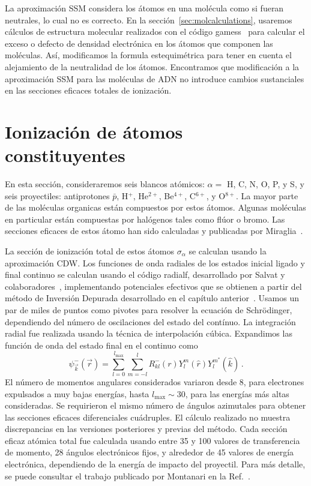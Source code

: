 La aproximación SSM considera los átomos en una molécula como si fueran
neutrales, lo cual no es correcto. En la sección~\ref{sec:molcalculations}, 
usaremos cálculos de estructura molecular realizados con el código
{\sc gamess}~\cite{gamess} para calcular el exceso o defecto de densidad 
electrónica en los átomos que componen las moléculas. Así, modificamos
la formula estequimétrica para tener en cuenta el alejamiento de la 
neutralidad de los átomos. Encontramos que modificación a la aproximación 
SSM para las moléculas de ADN no introduce cambios sustanciales en las 
secciones eficaces totales de ionización.

\section{Ionización de átomos constituyentes}
\label{sec:atoms}

En esta sección, consideraremos seis blancos atómicos: $\alpha=$ H, C, 
N, O, P, y S, y seis proyectiles: antiprotones $\bar{p}$, H$^{+}$, 
He$^{2+}$, Be$^{4+}$, C$^{6+}$, y O$^{8+}$. La mayor parte de las 
moléculas organicas están compuestos por estos átomos. Algunas moléculas
en particular están compuestas por halógenos tales como flúor o bromo.
Las secciones eficaces de estos átomo han sido calculadas y publicadas
por Miraglia~\cite{miraglia2008}.

La sección de ionización total de estos átomos $\sigma_{\alpha}$ se
calculan usando la aproximación CDW. Los funciones de onda radiales
de los estados inicial ligado y final continuo se calculan usando el
código {\sc radialf}, desarrollado por Salvat y 
colaboradores~\cite{salvat1995}, implementando potenciales efectivos que
se obtienen a partir del método de Inversión Depurada desarrollado en el
capítulo anterior~\cite{Mendez:16,Mendez:18}. Usamos un par de miles
de puntos como pivotes para resolver la ecuación de Schr\"{o}dinger,
dependiendo del número de oscilaciones del estado del contínuo. 
La integración radial fue realizada usando la técnica de interpolación
cúbica. Expandimos las función de onda del estado final en el continuo
como
\begin{equation}
\psi_{\overrightarrow{k}}^{-}(\overrightarrow{r})=\sum_{l=0}^{l_{\max
}}\sum_{m=-l}^{l}R_{kl}^{-}(r)Y_{l}^{m}(\widehat{r})Y_{l}^{m^{\ast }}
(\widehat{k})\,.
\label{eq:contwave}
\end{equation}
El número de momentos angulares considerados variaron desde 8, para 
electrones expulsados a muy bajas energías, hasta $l_{\max}\sim 30$, 
para las energías más altas consideradas. Se requirieron el mismo 
número de ángulos azimutales para obtener las secciones eficaces 
diferenciales cuádruples. El cálculo realizado no muestra discrepancias 
en las versiones posteriores y previas del método. Cada sección eficaz
atómica total fue calculada usando entre 35 y 100 valores de 
transferencia de momento, 28 ángulos electrónicos fijos, y alrededor
de 45 valores de energía electrónica, dependiendo de la energía de 
impacto del proyectil. Para más detalle, se puede consultar el trabajo
publicado por Montanari en la Ref.~\cite{montanari2017}. 

